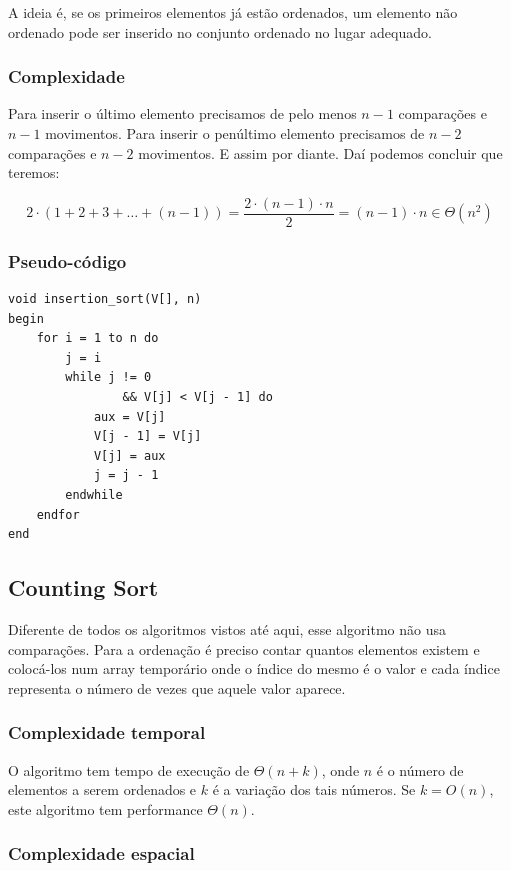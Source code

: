 A ideia é, se os primeiros elementos já estão ordenados, um elemento não
ordenado pode ser inserido no conjunto ordenado no lugar adequado.

\subsubsection{Complexidade}

Para inserir o último elemento precisamos de pelo menos $n - 1$
comparações e $n - 1$ movimentos. Para inserir o penúltimo elemento
precisamos de $n - 2$ comparações e $n - 2$ movimentos. E assim por
diante. Daí podemos concluir que teremos:

\begin{equation}
2 \cdot (1 + 2 + 3 + \dots + (n - 1)) = \frac{2 \cdot (n - 1) \cdot n}{2} = (n - 1) \cdot n \in \Theta(n^2)
\end{equation}

\subsubsection{Pseudo-código}

\begin{verbatim}
void insertion_sort(V[], n)
begin
    for i = 1 to n do
        j = i
        while j != 0
                && V[j] < V[j - 1] do
            aux = V[j]
            V[j - 1] = V[j]
            V[j] = aux
            j = j - 1
        endwhile
    endfor
end
\end{verbatim}
\subsection{Counting Sort}

Diferente de todos os algoritmos vistos até aqui, esse algoritmo não usa
comparações. Para a ordenação é preciso contar quantos elementos existem
e colocá-los num array temporário onde o índice do mesmo é o valor e
cada índice representa o número de vezes que aquele valor aparece.

\subsubsection{Complexidade temporal}

O algoritmo tem tempo de execução de $\Theta(n + k)$, onde $n$ é o
número de elementos a serem ordenados e $k$ é a variação dos tais
números. Se $k = O(n)$, este algoritmo tem performance $\Theta(n)$.

\subsubsection{Complexidade espacial}

